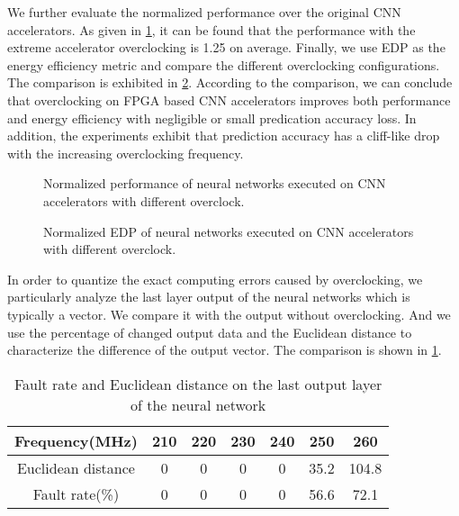 We further evaluate the normalized performance over the original CNN accelerators.
As given in \ref{fig:relative_time_overclock}, it can be found that the performance with the extreme accelerator 
overclocking is 1.25 on average. 
Finally, we use EDP as the energy efficiency metric and compare the 
different overclocking configurations. The comparison is exhibited in \ref{fig:relative_energy_overclock}.
According to the comparison, we can conclude that overclocking on FPGA based CNN 
accelerators improves both performance and energy efficiency with negligible or small 
predication accuracy loss. In addition, the experiments exhibit that prediction 
accuracy has a cliff-like drop with the increasing overclocking frequency. 

\begin{figure}
    \caption{Normalized performance of neural networks executed on CNN accelerators with different overclock.}
\label{fig:relative_time_overclock}
\vspace{-1em}
\end{figure}

\begin{figure}
    \caption{Normalized EDP of neural networks executed on CNN accelerators with different overclock.}
\label{fig:relative_energy_overclock}
\vspace{-1em}
\end{figure}

In order to quantize the exact computing errors caused by overclocking, we 
particularly analyze the last layer output of the neural networks which 
is typically a vector. We compare it with the output without overclocking.
And we use the percentage of changed output data and the Euclidean distance to 
characterize the difference of the output vector. 
The comparison is shown in \ref{tab:fr_ed}.

\begin{table}
        \centering
        \vspace{-0.3em}
        \caption{Fault rate and Euclidean distance on the last output layer of the neural network}
        \label{tab:fr_ed}
        \vspace{-0.3em}
        \begin{tabular}{c|cccccc}
                \toprule
                Frequency(MHz) & 210 & 220 & 230 & 240 & 250 & 260 \\
                \midrule
                Euclidean distance & 0 & 0 & 0 & 0 & 35.2 & 104.8 \\
		\midrule
                Fault rate(\%) & 0 & 0 & 0 & 0 & 56.6 & 72.1 \\
                \bottomrule
        \end{tabular}
        \vspace{-1em}
\end{table}

